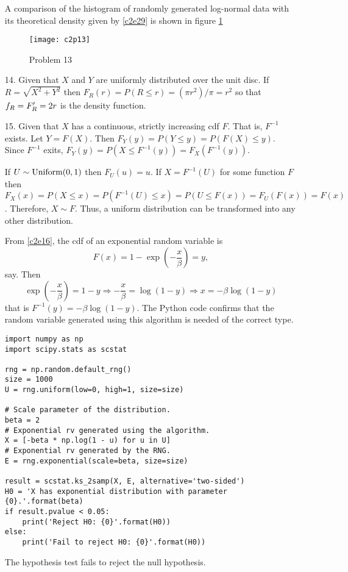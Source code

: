 \documentclass{article}
\begin{document}
\begin{enumerate}
A comparison of the histogram of randomly generated log-normal data with its
theoretical density given by \eqref{c2e29} is shown in figure \ref{c2f2}
\begin{figure}
\centering
\texttt{[image: c2p13]}
\caption{Problem 13}\label{c2f2}
\end{figure}

\item[14.] Given that $X$ and $Y$ are uniformly distributed over the unit disc.
If $R = \sqrt{X^2 + Y^2}$ then $F_R(r) = P(R \le r) = (\pi r^2)/\pi = r^2$ so 
that $f_R = F_R^\prime = 2r$ is the density function.

\item[15.] Given that $X$ has a continuous, strictly increasing cdf $F$. That is,
$F^{-1}$ exists. Let $Y = F(X)$. Then $F_Y(y) = P(Y \le y) = P(F(X) \le y)$. 
Since $F^{-1}$ exits, $F_Y(y) = P(X \le F^{-1}(y)) = F_X(F^{-1}(y))$.

If $U \sim \text{Uniform}(0, 1)$ then $F_U(u) = u$. If $X = F^{-1}(U)$ for some function
$F$ then $F_X(x) = P(X \le x) = P(F^{-1}(U) \le x) = P(U \le F(x)) = F_U(F(x)) =
F(x)$. Therefore, $X \sim F$. Thus, a uniform distribution can be transformed into 
any other distribution.

From \eqref{c2e16}, the cdf of an exponential random variable is
\[
F(x) = 1 - \exp\left(-\frac{x}{\beta}\right) = y,
\]
say. Then 
\[
\exp\left(-\frac{x}{\beta}\right) = 1 - y \Rightarrow -\frac{x}{\beta} = 
\log(1 - y) \Rightarrow x = -\beta\log(1 - y)
\]
that is $F^{-1}(y) = -\beta\log(1 - y)$. The Python code confirms that the random
variable generated using this algorithm is needed of the correct type.
\begin{verbatim}
import numpy as np
import scipy.stats as scstat

rng = np.random.default_rng()
size = 1000
U = rng.uniform(low=0, high=1, size=size)

# Scale parameter of the distribution.
beta = 2
# Exponential rv generated using the algorithm.
X = [-beta * np.log(1 - u) for u in U]
# Exponential rv generated by the RNG.
E = rng.exponential(scale=beta, size=size)

result = scstat.ks_2samp(X, E, alternative='two-sided')
H0 = 'X has exponential distribution with parameter {0}.'.format(beta)
if result.pvalue < 0.05:
    print('Reject H0: {0}'.format(H0))
else:
    print('Fail to reject H0: {0}'.format(H0))
\end{verbatim}
The hypothesis test fails to reject the null hypothesis.


\end{enumerate}
\end{document}
